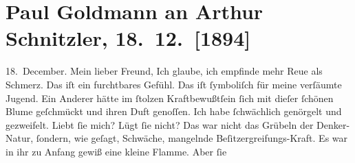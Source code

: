 

         
         \renewcommand{\erwaehntePersonen}{Personen:  ?? [Bräutigam von Hildegard Mitis], Hilda von Mitis, Maximilian von Mitis}
         \renewcommand{\erwaehnteOrte}{Orte: Bratislava, Italien, Paris, Wien}
         \renewcommand{\erwaehnteWerke}{}
               \section[Paul Goldmann an Arthur Schnitzler, 18. 12. {[}1894{]}]{ Paul Goldmann an Arthur Schnitzler, 18. 12. {[}1894{]}}\nopagebreak{}\rehead{ }\begin{ledgroupsized}[t]{13cm}\normalsize\beginnumbering \toendnotes[C]{\smallbreak\pagebreak[2]} 
\toendnotes[C]{\smallbreak}\pstart
           \raggedleft{}{\pb}18. December.\pend
           \pstart\center{}Mein lieber Freund,\pend\pstart
           Ich glaube, ich empfinde mehr Reue als Schmerz. Das iſt ein furchtbares Gefühl. Das
                  \label{K_mets_Goldmann_94-partII-4v}\label{K_mets_Goldmann_94-partII-4h} iſt ſymboliſch für meine verſäumte Jugend. Ein
               Anderer hätte im ſtolzen Kraftbewußtſein ſich mit dieſer ſchönen Blume geſchmückt und ihren Duft genoſſen. Ich
               habe ſchwächlich genörgelt und gezweifelt. Liebt ſie mich? Lügt ſie nicht? Das war
               nicht das Grübeln der Denker-Natur, ſondern, wie geſagt, Schwäche, mangelnde
               Beſitzergreifungs-Kraft. Es war in ihr zu Anfang gewiß eine kleine Flamme. Aber ſie

\end{ledgroupsized}

